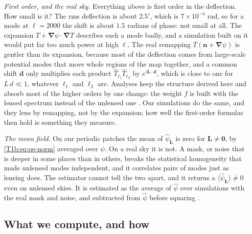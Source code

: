 \emph{First order, and the real sky.} Everything above is first order in the deflection. How small is it? The rms deflection is about $2.5'$, which is $7\times10^{-4}$ rad, so for a mode at $\ell=2000$ the shift is about $1.5$ radians of phase: not small at all. The expansion $T+\bm\nabla\psi\cdot\bm\nabla T$ describes such a mode badly, and a simulation built on it would put far too much power at high $\ell$. The real remapping $T(\bm n+\bm\nabla\psi)$ is gentler than its expansion, because most of the deflection comes from large-scale potential modes that move whole regions of the map together, and a common shift $\bm d$ only multiplies each product $\hat T_{\bm\ell_1}\hat T_{\bm\ell_2}$ by $e^{i\bm L\cdot\bm d}$, which is close to one for $L\,d\ll1$, whatever $\ell_1$ and $\ell_2$ are. Analyses keep the structure derived here and absorb most of the higher orders by one change: the weight $f$ is built with the lensed spectrum instead of the unlensed one \cite{Hanson2011}. Our simulations do the same, and they lens by remapping, not by the expansion; how well the first-order formulas then hold is something they measure.

\emph{The mean field.} On our periodic patches the mean of $\hat\psi_{\bm L}$ is zero for $\bm L\neq\bm0$, by \eqref{T1b:eq:qe-norm} averaged over $\psi$. On a real sky it is not. A mask, or noise that is deeper in some places than in others, breaks the statistical homogeneity that made unlensed modes independent, and it correlates pairs of modes just as lensing does. The estimator cannot tell the two apart, and it returns a  $\langle\hat\psi_{\bm L}\rangle\neq0$ even on unlensed skies. It is estimated as the average of $\hat\psi$ over simulations with the real mask and noise, and subtracted from $\hat\psi$ before squaring \cite{Hanson2011,Planck2018VIII}.

\subsection{What we compute, and how}
\label{T1b:sec:recon-code}

